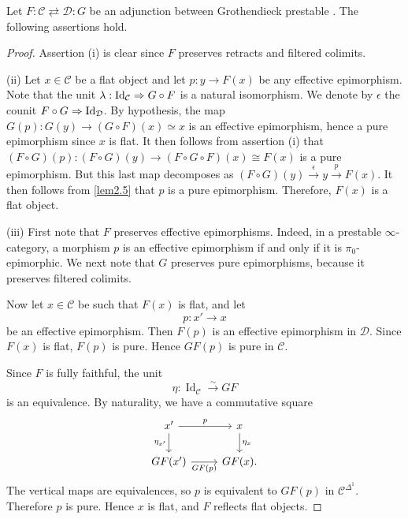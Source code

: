 \documentclass[a4paper,10pt, oneside]{amsart}
\begin{document}
	\begin{prop}
		Let $F: \mathcal{C} \rightleftarrows \mathcal{D}: G$ be an adjunction between Grothendieck prestable \infcats. The following assertions hold.
		
		
	\end{prop}
	\begin{proof}
		Assertion (i) is clear since $F$ preserves retracts and filtered colimits.
		
		(ii) Let $x \in \mathcal{C}$ be a flat object and let $p: y \rightarrow F(x)$ be any effective epimorphism. Note that the unit $\lambda: \mathrm{Id}_{\mathcal{C}} \Rightarrow G \circ F$ is a natural isomorphism. We denote by $\epsilon$ the counit $F \circ G \Rightarrow \mathrm{Id}_{\mathcal{D}}$. By hypothesis, the map $G(p): G(y) \rightarrow (G \circ F)(x) \simeq x$ is an effective epimorphism, hence a pure epimorphism since $x$ is flat. It then follows from assertion (i) that $(F \circ G)(p):(F \circ G)(y) \rightarrow(F \circ G \circ F)(x) \cong F(x)$ is a pure epimorphism. But this last map decomposes as $(F \circ G)(y) \xrightarrow{\epsilon} y \xrightarrow{p} F(x)$. It then follows from \cref{lem2.5} that $p$ is a pure epimorphism. Therefore, $F(x)$ is a flat object.
		
		(iii) First note that $F$ preserves effective epimorphisms.
		Indeed, in a prestable $\infty$-category, a morphism $p$ is an effective
		epimorphism if and only if it is $\pi_0$-epimorphic.
		We next note that $G$ preserves pure
		epimorphisms, because it preserves filtered colimits. 
		
		Now let $x\in\mathcal C$ be such that $F(x)$ is flat, and let
		\[
		p:x'\longrightarrow x
		\]
		be an effective epimorphism. Then $F(p)$ is an effective epimorphism in
		$\mathcal D$. Since $F(x)$ is flat, $F(p)$ is pure. Hence $GF(p)$ is pure in
		$\mathcal C$.
		
		Since $F$ is fully faithful, the unit
		\[
		\eta:\operatorname{Id}_{\mathcal C}\xrightarrow{\sim}GF
		\]
		is an equivalence. By naturality, we have a commutative square
		\[
		\begin{tikzcd}
			x' \ar[r,"p"] \ar[d,"\eta_{x'}"']
			&
			x \ar[d,"\eta_x"]
			\\
			GF(x') \ar[r,"GF(p)"']
			&
			GF(x).
		\end{tikzcd}
		\]
		The vertical maps are equivalences, so $p$ is equivalent to $GF(p)$ in
		$\mathcal C^{\Delta^1}$. Therefore $p$ is pure. Hence $x$ is flat, and
		$F$ reflects flat objects.
	\end{proof}
\end{document}
